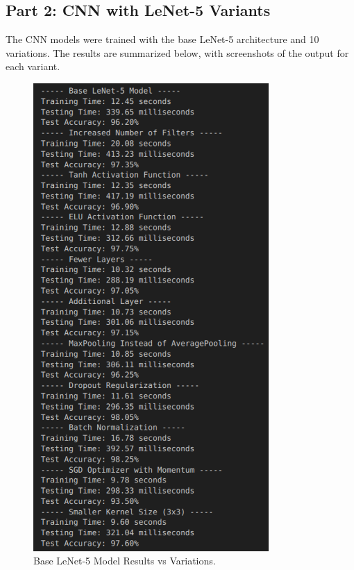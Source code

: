\documentclass[a4paper,12pt]{article}
\begin{document}
\subsection{Part 2: CNN with LeNet-5 Variants}
The CNN models were trained with the base LeNet-5 architecture and 10 variations. The results are summarized below, with screenshots of the output for each variant.

\begin{figure}[H]
    \centering
    \includegraphics[width=0.8\textwidth]{CNNvariations.png}
    \caption{Base LeNet-5 Model Results vs Variations.}
    \label{fig:cnn_base}
\end{figure}
\end{document}
